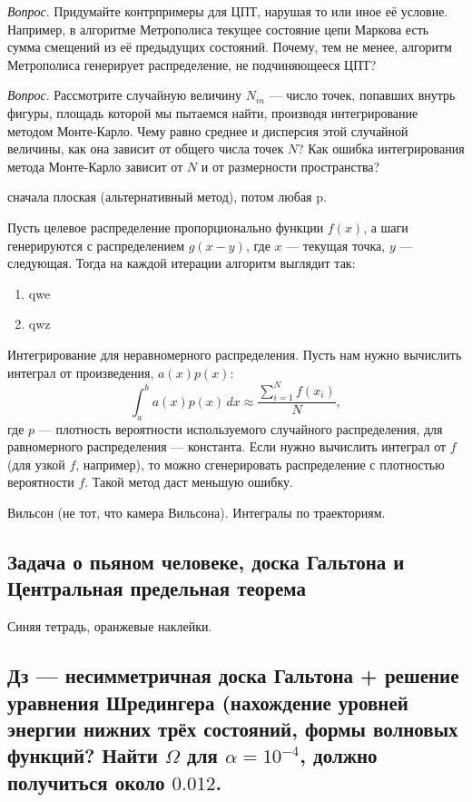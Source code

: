 \documentclass{book}
\begin{document}
\textit{Вопрос}. Придумайте контрпримеры для ЦПТ, нарушая то или иное её условие. Например, в
алгоритме Метрополиса текущее состояние цепи Маркова есть сумма смещений из её предыдущих
состояний. Почему, тем не менее, алгоритм Метрополиса генерирует распределение, не подчиняющееся
ЦПТ?

\textit{Вопрос}. Рассмотрите случайную величину $N_{in}$ --- число точек, попавших внутрь фигуры,
площадь которой мы пытаемся найти, производя интегрирование методом Монте-Карло. Чему равно среднее
и дисперсия этой случайной величины, как она зависит от общего числа точек $N$? Как ошибка
интегрирования метода Монте-Карло зависит от $N$ и от размерности пространства?

\clearpage

сначала плоская (альтернативный метод), потом любая p.

Пусть целевое распределение пропорционально функции $f(x)$, а шаги генерируются с распределением
$g(x - y)$, где $x$ --- текущая точка, $y$ --- следующая. Тогда на каждой итерации алгоритм
выглядит так:
\begin{enumerate}
    \item qwe
    \item qwz
\end{enumerate}

Интегрирование для неравномерного распределения. Пусть нам нужно вычислить интеграл от
произведения, $a(x) p(x)$:
\begin{equation}
    \int_a^b a(x) p(x) \, dx \approx \frac{\sum_{i=1}^N f(x_i)}{N},
\end{equation}
где $p$ --- плотность вероятности используемого случайного распределения, для равномерного
распределения --- константа. Если нужно вычислить интеграл от $f$ (для узкой $f$, например), то
можно сгенерировать распределение с плотностью вероятности $f$. Такой метод даст
меньшую ошибку.

Вильсон (не тот, что камера Вильсона). Интегралы по траекториям.

\subsection{Задача о пьяном человеке, доска Гальтона и Центральная предельная теорема}

Синяя тетрадь, оранжевые наклейки.

\subsection{Дз --- несимметричная доска Гальтона + решение уравнения Шредингера (нахождение уровней
энергии нижних трёх состояний, формы волновых функций? Найти $\Omega$ для $\alpha = 10^{-4}$,
должно получиться около $0.012$.}
\end{document}
